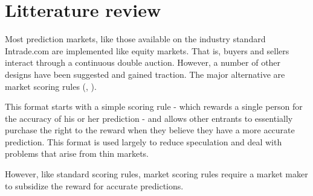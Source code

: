 

\section{Litterature review}


Most prediction markets, like those 
available on the industry standard Intrade.com are implemented 
like equity markets. That is, buyers and sellers interact through 
a continuous double auction. However, a number of other designs have been suggested and
gained traction. The major alternative are market scoring rules (\cite{hanson2003combinatorial}, \cite{hanson2007logarithmic}).

This format starts with a simple scoring rule - which rewards
a single person for the accuracy of his or her prediction - 
and allows other entrants to essentially purchase the right 
to the reward when they believe they have a more accurate prediction.
This format is used largely to reduce speculation and 
deal with problems that arise from thin markets. 

However, like standard scoring rules, market scoring rules 
require a market maker to subsidize the reward for accurate predictions. 

